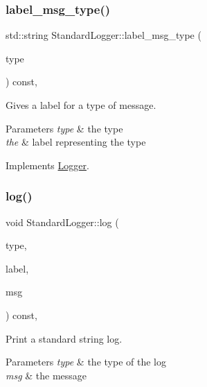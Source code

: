 \subsubsection{\texorpdfstring{label\_msg\_type()}{label\_msg\_type()}}
{\footnotesize\ttfamily std\+::string Standard\+Logger\+::label\+\_\+msg\+\_\+type (\begin{DoxyParamCaption}\item[{const \mbox{\hyperlink{class_logger_acd39cb578d7a6750c959f2fad38d8db6}{Logger\+::\+Type}} \&}]{type }\end{DoxyParamCaption}) const\hspace{0.3cm}{\ttfamily [inline]}, {\ttfamily [virtual]}}



Gives a label for a type of message. 


\begin{DoxyParams}{Parameters}
{\em type} & the type \\
\hline
{\em the} & label representing the type \\
\hline
\end{DoxyParams}


Implements \mbox{\hyperlink{class_logger_abe4434e4ae0efd8b41cb2a61458a710d}{Logger}}.

\mbox{\label{class_standard_logger_a11c29fca1b05d7ff331b298e9c91cd81}} 
\subsubsection{\texorpdfstring{log()}{log()}\hspace{0.1cm}{\footnotesize\ttfamily [1/2]}}
{\footnotesize\ttfamily void Standard\+Logger\+::log (\begin{DoxyParamCaption}\item[{const \mbox{\hyperlink{class_logger_acd39cb578d7a6750c959f2fad38d8db6}{Logger\+::\+Type}} \&}]{type,  }\item[{const std\+::string \&}]{label,  }\item[{const std\+::string \&}]{msg }\end{DoxyParamCaption}) const\hspace{0.3cm}{\ttfamily [inline]}, {\ttfamily [virtual]}}



Print a standard string log. 


\begin{DoxyParams}{Parameters}
{\em type} & the type of the log \\
\hline
{\em msg} & the message \\
\hline
\end{DoxyParams}


